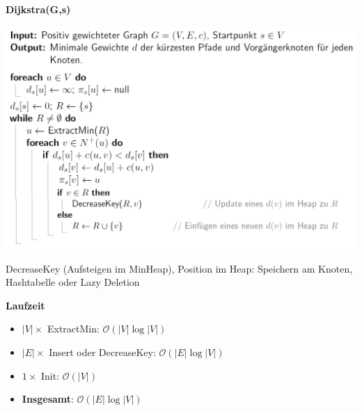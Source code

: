 \begin{sectionbox}
\textbf{Dijkstra(G,s)}\par
\includegraphics[width = \columnwidth]{../img/Dijkstra.png}\par
DecreaseKey (Aufsteigen im MinHeap), Position im Heap: Speichern am Knoten, Hashtabelle oder Lazy Deletion\par\smallskip
\textbf{Laufzeit}\par
\begin{itemize}
    \item $|V| \times$ ExtractMin: $\mathcal{O}(|V| \log |V|)$
    \item $|E| \times$ Insert oder DecreaseKey: $\mathcal{O}(|E| \log |V|)$
    \item $1 \times$ Init: $\mathcal{O}(|V|)$
    \item \textbf{Insgesamt}: $\mathcal{O}(|E| \log |V|)$
\end{itemize}

\end{sectionbox}
